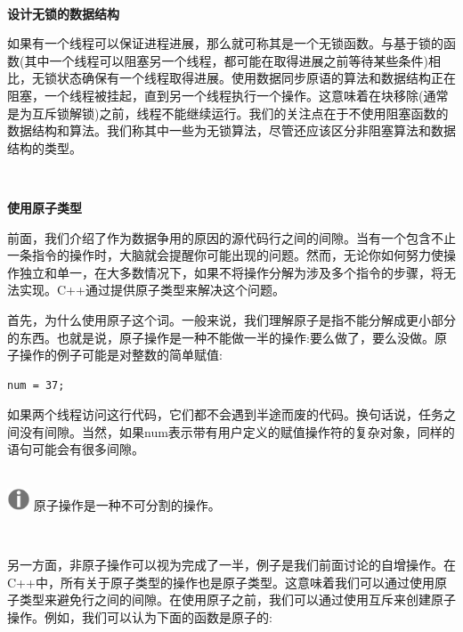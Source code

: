 \noindent\textbf{}\ \par
\textbf{设计无锁的数据结构} \ \par
如果有一个线程可以保证进程进展，那么就可称其是一个无锁函数。与基于锁的函数(其中一个线程可以阻塞另一个线程，都可能在取得进展之前等待某些条件)相比，无锁状态确保有一个线程取得进展。使用数据同步原语的算法和数据结构正在阻塞，一个线程被挂起，直到另一个线程执行一个操作。这意味着在块移除(通常是为互斥锁解锁)之前，线程不能继续运行。我们的关注点在于不使用阻塞函数的数据结构和算法。我们称其中一些为无锁算法，尽管还应该区分非阻塞算法和数据结构的类型。 \par

\noindent\textbf{}\ \par
\textbf{使用原子类型} \ \par
前面，我们介绍了作为数据争用的原因的源代码行之间的间隙。当有一个包含不止一条指令的操作时，大脑就会提醒你可能出现的问题。然而，无论你如何努力使操作独立和单一，在大多数情况下，如果不将操作分解为涉及多个指令的步骤，将无法实现。C++通过提供原子类型来解决这个问题。 \par
首先，为什么使用原子这个词。一般来说，我们理解原子是指不能分解成更小部分的东西。也就是说，原子操作是一种不能做一半的操作:要么做了，要么没做。原子操作的例子可能是对整数的简单赋值: \par

\begin{lstlisting}[caption={}]
num = 37;
\end{lstlisting}

如果两个线程访问这行代码，它们都不会遇到半途而废的代码。换句话说，任务之间没有间隙。当然，如果num表示带有用户定义的赋值操作符的复杂对象，同样的语句可能会有很多间隙。 \par

\hspace*{\fill} \\ %
\includegraphics[width=0.05\textwidth]{images/warn}
原子操作是一种不可分割的操作。 \par
\noindent\textbf{}\ \par

另一方面，非原子操作可以视为完成了一半，例子是我们前面讨论的自增操作。在C++中，所有关于原子类型的操作也是原子类型。这意味着我们可以通过使用原子类型来避免行之间的间隙。在使用原子之前，我们可以通过使用互斥来创建原子操作。例如，我们可以认为下面的函数是原子的: \par

